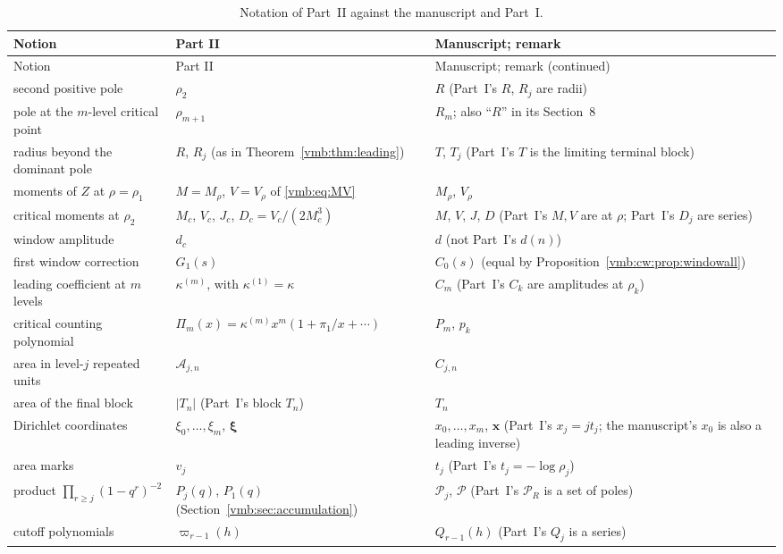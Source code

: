 \documentclass[11pt,a4paper]{article}
\numberwithin{equation}{section}
\theoremstyle{definition}\newtheorem{definition}[theorem]{Definition}
\theoremstyle{remark}\newtheorem{remark}[theorem]{Remark}
\newcommand{\calP}{\mathcal P}
\begin{document}
\begin{longtable}{@{}>{\raggedright\arraybackslash}p{}>{\raggedright\arraybackslash}p{}>{\raggedright\arraybackslash}p{}@{}}
\caption{Notation of Part~II against the manuscript and Part~I.}
\label{vmb:cw:tab:notation}\\
\toprule
Notion & Part II & Manuscript; remark\\
\midrule
\endfirsthead
\toprule
Notion & Part II & Manuscript; remark (continued)\\
\midrule
\endhead
second positive pole & $\rho_2$ & $R$ (Part~I's $R$, $R_j$ are radii)\\
pole at the $m$-level critical point & $\rho_{m+1}$ & $R_m$; also ``$R$'' in its Section~8\\
radius beyond the dominant pole & $R$, $R_j$ (as in Theorem~\ref{vmb:thm:leading}) & $T$, $T_j$ (Part~I's $T$ is the limiting terminal block)\\
moments of $Z$ at $\rho=\rho_1$ & $M=M_\rho$, $V=V_\rho$ of \eqref{vmb:eq:MV} & $M_\rho$, $V_\rho$\\
critical moments at $\rho_2$ & $M_c$, $V_c$, $J_c$, $D_c=V_c/(2M_c^3)$ & $M$, $V$, $J$, $D$ (Part~I's $M,V$ are at $\rho$; Part~I's $D_j$ are series)\\
window amplitude & $d_c$ & $d$ (not Part~I's $d(n)$)\\
first window correction & $G_1(s)$ & $C_0(s)$ (equal by Proposition~\ref{vmb:cw:prop:windowall})\\
leading coefficient at $m$ levels & $\kappa^{(m)}$, with $\kappa^{(1)}=\kappa$ & $C_m$ (Part~I's $C_k$ are amplitudes at $\rho_k$)\\
critical counting polynomial & $\Pi_m(x)=\kappa^{(m)}x^m(1+\pi_1/x+\cdots)$ & $P_m$, $p_k$\\
area in level-$j$ repeated units & $\mathcal A_{j,n}$ & $C_{j,n}$\\
area of the final block & $|T_n|$ (Part~I's block $T_n$) & $T_n$\\
Dirichlet coordinates & $\xi_0,\ldots,\xi_m$, $\bm\xi$ & $x_0,\ldots,x_m$, $\bm x$ (Part~I's $x_j=jt_j$; the manuscript's $x_0$ is also a leading inverse)\\
area marks & $v_j$ & $t_j$ (Part~I's $t_j=-\log\rho_j$)\\
product $\prod_{r\ge j}(1-q^r)^{-2}$ & $P_j(q)$, $P_1(q)$ (Section~\ref{vmb:sec:accumulation}) & $\mathcal P_j$, $\mathcal P$ (Part~I's $\calP_R$ is a set of poles)\\
cutoff polynomials & $\varpi_{r-1}(h)$ & $Q_{r-1}(h)$ (Part~I's $Q_j$ is a series)\\

\end{longtable}
\end{document}
